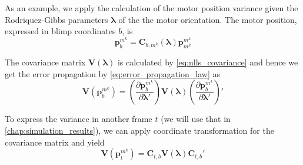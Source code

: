 As an example, we apply the calculation of the motor position variance given the Rodriquez-Gibbs parameters $\boldsymbol{\lambda}$ of the the motor orientation.
The motor position, expressed in blimp coordinates $b$, is
\begin{equation*}
\mathbf{p}^{m^k}_b = \mathbf{C}_{b,m^k}(\boldsymbol{\lambda}) \mathbf{p}^{m^k}_{m^k}
\end{equation*}

The covariance matrix $\mathbf{V}(\boldsymbol{\lambda})$ is calculated by \cref{eq:nlls_covariance} and hence we get the error propagation by \cref{eq:error_propagation_law} as
\begin{equation}
\mathbf{V} (\mathbf{p}^{m^k}_b) = 
\left(\frac{\partial \mathbf{p}^{m^k}_b}{\partial \boldsymbol{\lambda}'}\right)
\mathbf{V}(\boldsymbol{\lambda})
\left(\frac{\partial \mathbf{p}^{m^k}_b}{\partial \boldsymbol{\lambda}'}\right)'
\end{equation}

To express the variance in another frame $t$ (we will use that in \cref{chap:simulation_results}), we can apply coordinate transformation for the covariance matrix and yield
\begin{equation}
\label{eq:variance_coordinates_tangential}
\mathbf{V} (\mathbf{p}^{m^k}_t) = 
\mathbf{C}_{t,b}
\mathbf{V}(\boldsymbol{\lambda})
\mathbf{C}_{t,b}'
\end{equation}
